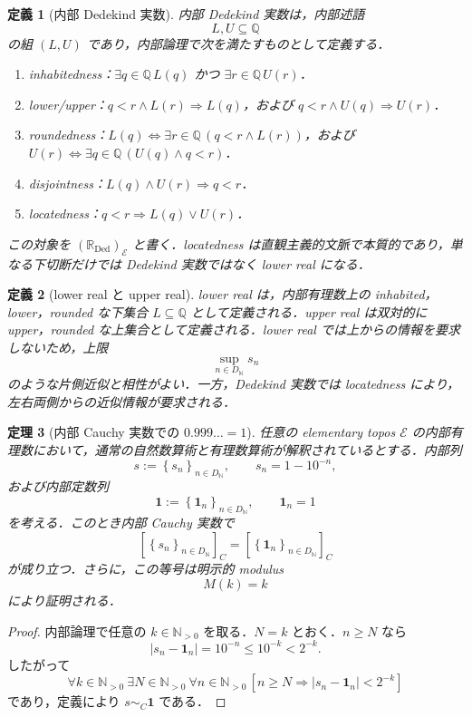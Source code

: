 \documentclass[a4paper,11pt]{ltjsarticle}
\theoremstyle{jpdef}
\newtheorem{definition}{定義}[section]
\theoremstyle{jpthm}
\newtheorem{theorem}[definition]{定理}
\newcommand{\N}{\mathbb{N}}
\newcommand{\DN}{D_{\N}}
\newcommand{\seq}[2]{\left\{#1\right\}_{#2}}
\newcommand{\RealDed}{\mathbb{R}_{\mathrm{Ded}}}
\begin{document}
\begin{definition}[内部 Dedekind 実数]
内部 Dedekind 実数は，内部述語
\[
  L,U\subseteq\mathbb Q
\]
の組 \((L,U)\) であり，内部論理で次を満たすものとして定義する．
\begin{enumerate}
\item inhabitedness：\(\exists q\in\mathbb Q\, L(q)\) かつ \(\exists r\in\mathbb Q\, U(r)\)．
\item lower/upper：\(q<r\land L(r)\Rightarrow L(q)\)，および \(q<r\land U(q)\Rightarrow U(r)\)．
\item roundedness：\(L(q)\Leftrightarrow \exists r\in\mathbb Q\,(q<r\land L(r))\)，および \(U(r)\Leftrightarrow \exists q\in\mathbb Q\,(U(q)\land q<r)\)．
\item disjointness：\(L(q)\land U(r)\Rightarrow q<r\)．
\item locatedness：\(q<r\Rightarrow L(q)\lor U(r)\)．
\end{enumerate}
この対象を \((\RealDed)_{\mathcal E}\) と書く．locatedness は直観主義的文脈で本質的であり，単なる下切断だけでは Dedekind 実数ではなく lower real になる．
\end{definition}

\begin{definition}[lower real と upper real]
lower real は，内部有理数上の inhabited，lower，rounded な下集合 \(L\subseteq\mathbb Q\) として定義される．upper real は双対的に upper，rounded な上集合として定義される．lower real では上からの情報を要求しないため，上限
\[
  \sup_{n\in\DN}s_n
\]
のような片側近似と相性がよい．一方，Dedekind 実数では locatedness により，左右両側からの近似情報が要求される．
\end{definition}

\begin{theorem}[内部 Cauchy 実数での \(0.999\ldots=1\)]
任意の elementary topos \(\mathcal E\) の内部有理数において，通常の自然数算術と有理数算術が解釈されているとする．内部列
\[
  s:=\seq{s_n}{n\in\DN},\qquad s_n=1-10^{-n},
\]
および内部定数列
\[
  \mathbf1:=\seq{\mathbf1_n}{n\in\DN},\qquad \mathbf1_n=1
\]
を考える．このとき内部 Cauchy 実数で
\[
  [\seq{s_n}{n\in\DN}]_C=[\seq{\mathbf1_n}{n\in\DN}]_C
\]
が成り立つ．さらに，この等号は明示的 modulus
\[
  M(k)=k
\]
により証明される．
\end{theorem}

\begin{proof}
内部論理で任意の \(k\in\mathbb N_{>0}\) を取る．\(N=k\) とおく．\(n\ge N\) なら
\[
  |s_n-\mathbf1_n|=10^{-n}\le 10^{-k}<2^{-k}.
\]
したがって
\[
  \forall k\in\mathbb N_{>0}\ \exists N\in\mathbb N_{>0}\
  \forall n\in\mathbb N_{>0}\,[n\ge N\Rightarrow |s_n-\mathbf1_n|<2^{-k}]
\]
であり，定義により \(s\sim_C\mathbf1\) である．
\end{proof}
\end{document}
